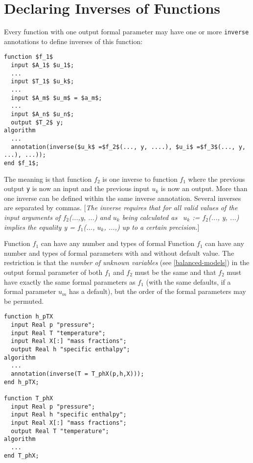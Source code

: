 \section{Declaring Inverses of Functions}

Every function with one output formal parameter may have one or more
\lstinline!inverse! annotations to define inverses of this function:

\begin{lstlisting}[language=modelica,mathescape=true]
function $f_1$
  input $A_1$ $u_1$;
  ...
  input $T_1$ $u_k$;
  ...
  input $A_m$ $u_m$ = $a_m$;
  ...
  input $A_n$ $u_n$;
  output $T_2$ y;
algorithm
  ...
  annotation(inverse($u_k$ =$f_2$(..., y, ....), $u_i$ =$f_3$(..., y, ...), ...));
end $f_1$;
\end{lstlisting}

The meaning is that function $f_2$ is one inverse to
function $f_1$ where the previous output \lstinline!y! is now an
input and the previous input $u_k$ is now an output. More
than one inverse can be defined within the same inverse annotation.
Several inverses are separated by commas. {[}\emph{The inverse requires
that for all valid values of the input arguments of
$f_2$(...,y, ...) and $u_k$ being calculated
as~ $u_k$ := $f_2$(..., y, ...)~ implies the
equality y = $f_1$(..., $u_k$, ...,) up to a
certain precision.}{]}

Function $f_1$ can have any number and types of formal
Function $f_1$ can have any number and types of formal
parameters with and without default value. The restriction is that the
\emph{number of unknown variables} (see \autoref{balanced-models}) in the output formal
parameter of both $f_1$ and $f_2$ must be
the same and that $f_2$ must have exactly the same formal
parameters as $f_1$ (with the same defaults, if a formal
parameter $u_m$ has a default), but the order of the formal
parameters may be permuted.

\begin{example}
\begin{lstlisting}[language=modelica]
function h_pTX
  input Real p "pressure";
  input Real T "temperature";
  input Real X[:] "mass fractions";
  output Real h "specific enthalpy";
algorithm
  ...
  annotation(inverse(T = T_phX(p,h,X)));
end h_pTX;

function T_phX
  input Real p "pressure";
  input Real h "specific enthalpy";
  input Real X[:] "mass fractions";
  output Real T "temperature";
algorithm
  ...
end T_phX;
\end{lstlisting}
\end{example}

